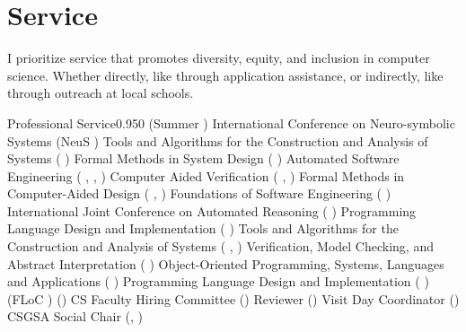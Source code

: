 \documentclass{federico_cv}
\begin{document}
\section{Service}

I prioritize service that promotes diversity, equity, and inclusion in computer
science. Whether directly, like through application assistance, or
indirectly, like through outreach at local schools.

\begin{tblSubSection}{Professional Service}{0.95}{0}
{ (Summer )}
{International Conference on Neuro-symbolic Systems (NeuS )}
{Tools and Algorithms for the Construction and Analysis of Systems ( )}
{Formal Methods in System Design ( )}
{Automated Software Engineering ( , , )}
{Computer Aided Verification ( , )}
{Formal Methods in Computer-Aided Design ( , )}
{Foundations of Software Engineering ( )}
{International Joint Conference on Automated Reasoning ( )}
{Programming Language Design and Implementation ( )}
{Tools and Algorithms for the Construction and Analysis of Systems ( , )}
{Verification, Model Checking, and Abstract Interpretation ( )}
{Object-Oriented Programming, Systems, Languages and Applications ( )}
{Programming Language Design and Implementation ( )}
{ (FLoC )}
{ ()}
{CS Faculty Hiring Committee ()}
{ Reviewer ()}
{Visit Day Coordinator ()}
{CSGSA Social Chair (, )}
\end{tblSubSection}
\end{document}
